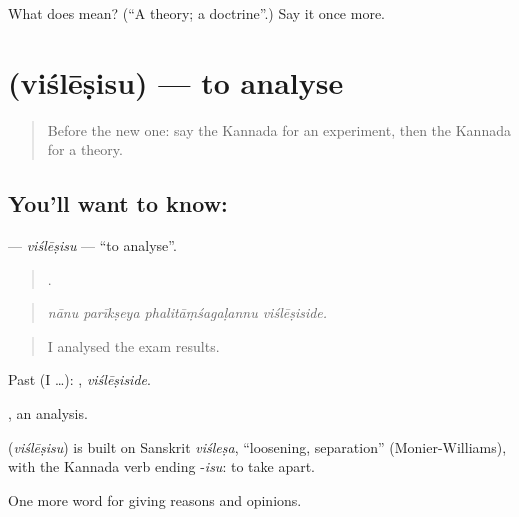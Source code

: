 \begin{tcolorbox}[breakable,colback=teal!4,colframe=teal!35!black,title={Before you move on}]
What does  mean? (\textquotedblleft{}A theory; a doctrine\textquotedblright{}.) Say it once more.
\end{tcolorbox}
\section[\texorpdfstring{\kn{ವಿಶ್ಲೇಷಿಸು} (viślēṣisu)}{ವಿಶ್ಲೇಷಿಸು (viślēṣisu)}]{ (viślēṣisu) — to analyse}

\label{lesson:KA-C407-vislesisu}



\begin{quote}
Before the new one: say the Kannada for an experiment, then the Kannada for a theory.
\end{quote}

\subsection*{You'll want to know: }
\textbf{} — \emph{viślēṣisu} — \textquotedblleft{}to analyse\textquotedblright{}.

\begin{quote}
   .
\end{quote}

\begin{quote}
\emph{nānu parīkṣeya phalitāṃśagaḷannu viślēṣiside.}
\end{quote}

\begin{quote}
I analysed the exam results.
\end{quote}

Past (I …): , \emph{viślēṣiside}.

, an analysis.

\begin{cousinweb}
\textbf{} (\emph{viślēṣisu}) is built on Sanskrit \emph{viśleṣa}, \textquotedblleft{}loosening, separation\textquotedblright{} (Monier-Williams), with the Kannada verb ending -\emph{isu}: to take apart.
\end{cousinweb}

\begin{grammarlens}[title={What you've built}]
One more word for giving reasons and opinions.
\end{grammarlens}

